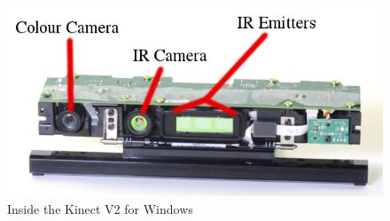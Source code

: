 \documentclass[11pt]{article}
\begin{document}
\begin{center}
	\begin{figure}[H]
		\begin{center}
			\includegraphics[scale=0.5]{pics/kinectinternal}
				\caption{Inside the Kinect V2 for Windows}
				\label{kinectinternal}
		\end{center}
	\end{figure}
\end{center}
\end{document}
